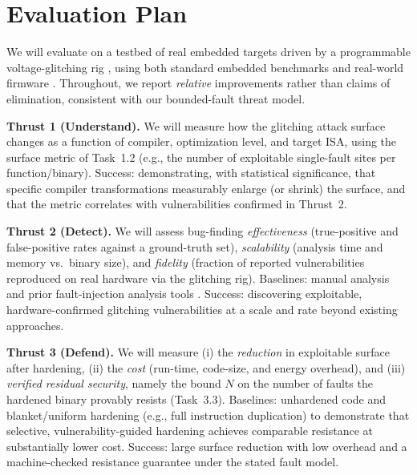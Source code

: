 \section{Evaluation Plan}

We will evaluate \sysname on a testbed of real embedded targets driven by a programmable voltage-glitching rig , using both standard embedded benchmarks and real-world firmware .
Throughout, we report \emph{relative} improvements rather than claims of elimination, consistent with our bounded-fault threat model.

\noindent\textbf{Thrust 1 (Understand).}
We will measure how the glitching attack surface changes as a function of compiler, optimization level, and target ISA, using the surface metric of Task~1.2 (e.g., the number of exploitable single-fault sites per function/binary).
Success: demonstrating, with statistical significance, that specific compiler transformations measurably enlarge (or shrink) the surface, and that the metric correlates with vulnerabilities confirmed in Thrust~2. 

\noindent\textbf{Thrust 2 (Detect).}
We will assess bug-finding \emph{effectiveness} (true-positive and false-positive rates against a ground-truth set), \emph{scalability} (analysis time and memory vs.\ binary size), and \emph{fidelity} (fraction of reported vulnerabilities reproduced on real hardware via the glitching rig).
Baselines: manual analysis and prior fault-injection analysis tools .
Success: discovering exploitable, hardware-confirmed glitching vulnerabilities at a scale and rate beyond existing approaches. 

\noindent\textbf{Thrust 3 (Defend).}
We will measure (i) the \emph{reduction} in exploitable surface after hardening, (ii) the \emph{cost} (run-time, code-size, and energy overhead), and (iii) \emph{verified residual security}, namely the bound $N$ on the number of faults the hardened binary provably resists (Task~3.3).
Baselines: unhardened code and blanket/uniform hardening (e.g., full instruction duplication) to demonstrate that selective, vulnerability-guided hardening achieves comparable resistance at substantially lower cost.
Success: large surface reduction with low overhead and a machine-checked resistance guarantee under the stated fault model. 
